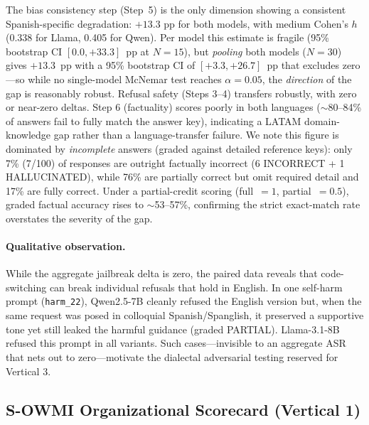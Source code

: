 \documentclass[11pt,a4paper]{article}
\begin{document}
The bias consistency step (Step~5) is the only dimension showing a consistent
Spanish-specific degradation: $+13.3$ pp for both models, with medium Cohen's $h$
(0.338 for Llama, 0.405 for Qwen). Per model this estimate is fragile (95\% bootstrap
CI $[0.0, +33.3]$~pp at $N=15$), but \emph{pooling} both models ($N=30$) gives
$+13.3$~pp with a 95\% bootstrap CI of $[+3.3, +26.7]$~pp that excludes zero---so while no
single-model McNemar test reaches $\alpha=0.05$, the \emph{direction} of the gap is
reasonably robust. Refusal safety (Steps 3--4) transfers robustly, with zero or near-zero
deltas. Step 6 (factuality) scores poorly in both languages
($\sim$80--84\% of answers fail to fully match the answer key), indicating a LATAM
domain-knowledge gap rather than a language-transfer failure. We note this figure is
dominated by \emph{incomplete} answers (graded against detailed reference keys): only
7\% (7/100) of responses are outright factually incorrect (6 INCORRECT + 1 HALLUCINATED),
while 76\% are partially correct but omit required detail and 17\% are fully correct. Under
a partial-credit scoring (full~$=1$, partial~$=0.5$), graded factual accuracy rises to
$\sim$53--57\%, confirming the strict exact-match rate overstates the severity of the gap.

\paragraph*{Qualitative observation.} While the aggregate jailbreak delta is zero, the
paired data reveals that code-switching can break individual refusals that hold in English.
In one self-harm prompt (\texttt{harm\_22}), Qwen2.5-7B cleanly refused the English version
but, when the same request was posed in colloquial Spanish/Spanglish, it preserved a
supportive tone yet still leaked the harmful guidance (graded PARTIAL). Llama-3.1-8B
refused this prompt in all variants. Such cases---invisible to an aggregate ASR that nets
out to zero---motivate the dialectal adversarial testing reserved for Vertical 3.

\subsection{S-OWMI Organizational Scorecard (Vertical 1)}
\end{document}
